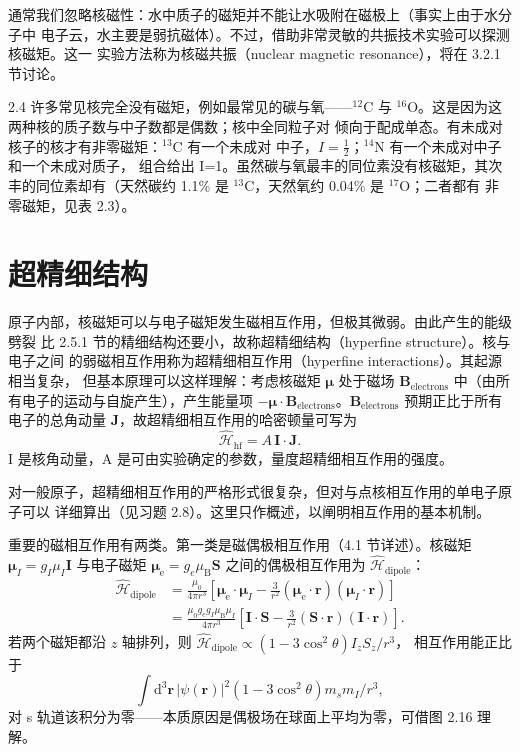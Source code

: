 通常我们忽略核磁性：水中质子的磁矩并不能让水吸附在磁极上（事实上由于水分子中
电子云，水主要是弱抗磁体）。不过，借助非常灵敏的共振技术实验可以探测核磁矩。这一
实验方法称为核磁共振（nuclear magnetic resonance），将在 3.2.1 节讨论。

\begin{example}{2.4}
许多常见核完全没有磁矩，例如最常见的碳与氧——${}^{12}\mathrm{C}$ 与
${}^{16}\mathrm{O}$。这是因为这两种核的质子数与中子数都是偶数；核中全同粒子对
倾向于配成单态。有未成对核子的核才有非零磁矩：${}^{13}\mathrm{C}$ 有一个未成对
中子，$I=\frac{1}{2}$；${}^{14}\mathrm{N}$ 有一个未成对中子和一个未成对质子，
组合给出 I=1。虽然碳与氧最丰的同位素没有核磁矩，其次丰的同位素却有（天然碳约
1.1\% 是 ${}^{13}\mathrm{C}$，天然氧约 0.04\% 是 ${}^{17}\mathrm{O}$；二者都有
非零磁矩，见表 2.3）。
\end{example}

\section{超精细结构}

原子内部，核磁矩可以与电子磁矩发生磁相互作用，但极其微弱。由此产生的能级劈裂
比 2.5.1 节的精细结构还要小，故称超精细结构（hyperfine structure）。核与电子之间
的弱磁相互作用称为超精细相互作用（hyperfine interactions）。其起源相当复杂，
但基本原理可以这样理解：考虑核磁矩 $\boldsymbol{\mu}$ 处于磁场
$\mathbf{B}_{\text{electrons}}$ 中（由所有电子的运动与自旋产生），产生能量项
$-\boldsymbol{\mu}\cdot\mathbf{B}_{\text{electrons}}$。$\mathbf{B}_{\text{electrons}}$
预期正比于所有电子的总角动量 $\mathbf{J}$，故超精细相互作用的哈密顿量可写为
\begin{equation*}
\hat{\mathcal{H}}_{\mathrm{hf}} = A\,\mathbf{I}\cdot\mathbf{J}.\tag{2.64}
\end{equation*}
I 是核角动量，A 是可由实验确定的参数，量度超精细相互作用的强度。

对一般原子，超精细相互作用的严格形式很复杂，但对与点核相互作用的单电子原子可以
详细算出（见习题 2.8）。这里只作概述，以阐明相互作用的基本机制。

重要的磁相互作用有两类。第一类是磁偶极相互作用（4.1 节详述）。核磁矩
$\boldsymbol{\mu}_I=g_I\mu_I\mathbf{I}$ 与电子磁矩
$\boldsymbol{\mu}_{\mathrm{e}}=g_e\mu_{\mathrm{B}}\mathbf{S}$ 之间的偶极相互作用为
$\hat{\mathcal{H}}_{\text{dipole}}$：
\begin{align*}
\hat{\mathcal{H}}_{\text{dipole}} &= \frac{\mu_0}{4\pi r^{3}}\left[\boldsymbol{\mu}_{\mathrm{e}}\cdot\boldsymbol{\mu}_I - \frac{3}{r^{2}}(\boldsymbol{\mu}_{\mathrm{e}}\cdot\mathbf{r})(\boldsymbol{\mu}_I\cdot\mathbf{r})\right]\tag{2.65}\\
&= \frac{\mu_0 g_e g_I\mu_{\mathrm{B}}\mu_I}{4\pi r^{3}}\left[\mathbf{I}\cdot\mathbf{S} - \frac{3}{r^{2}}(\mathbf{S}\cdot\mathbf{r})(\mathbf{I}\cdot\mathbf{r})\right].\tag{2.66}
\end{align*}
若两个磁矩都沿 $z$ 轴排列，则 $\hat{\mathcal{H}}_{\text{dipole}}\propto(1-3\cos^{2}\theta)I_zS_z/r^{3}$，
相互作用能正比于
\begin{equation*}
\int\mathrm{d}^{3}\mathbf{r}\,|\psi(\mathbf{r})|^{2}(1-3\cos^{2}\theta)m_sm_I/r^{3},\tag{2.67}
\end{equation*}
对 s 轨道该积分为零——本质原因是偶极场在球面上平均为零，可借图 2.16 理解。

